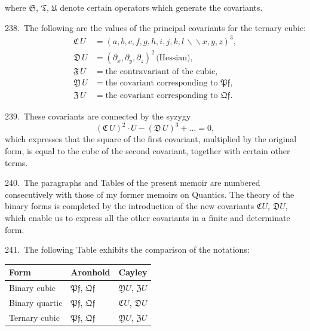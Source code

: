 \documentclass[11pt,a4paper]{article}
\theoremstyle{plain}
\theoremstyle{definition}
\theoremstyle{remark}
\begin{document}
where $\mathfrak{S}$, $\mathfrak{T}$, $\mathfrak{U}$ denote certain operators which generate the covariants.

\newpage
\setcounter{page}{334}

238.\ The following are the values of the principal covariants for the ternary cubic:
\begin{align*}
\mathfrak{C}\,U &= (a,b,c,f,g,h,i,j,k,l\,\backslash\!\!\backslash x,y,z)^3,\\
\mathfrak{D}\,U &= (\partial_x,\partial_y,\partial_z)^2\,\text{(Hessian)},\\
\mathfrak{F}\,U &= \text{the contravariant of the cubic},\\
\mathfrak{Y}\,U &= \text{the covariant corresponding to }\mathfrak{P}\mathfrak{f},\\
\mathfrak{Z}\,U &= \text{the covariant corresponding to }\mathfrak{Q}\mathfrak{f}.
\end{align*}

239.\ These covariants are connected by the syzygy
\[
(\mathfrak{C}\,U)^2\cdot U - (\mathfrak{D}\,U)^3 + \dots = 0,
\]
which expresses that the square of the first covariant, multiplied by the original form, is equal to the cube of the second covariant, together with certain other terms.

\newpage
\setcounter{page}{335}

240.\ The paragraphs and Tables of the present memoir are numbered consecutively with those of my former memoirs on Quantics. The theory of the binary forms is completed by the introduction of the new covariants $\mathfrak{C}U$, $\mathfrak{D}U$, which enable us to express all the other covariants in a finite and determinate form.

241.\ The following Table exhibits the comparison of the notations:

\begin{center}
\begin{tabular}{|l|l|l|}
\hline
\textbf{Form} & \textbf{Aronhold} & \textbf{Cayley} \\
\hline
Binary cubic & $\mathfrak{P}\mathfrak{f}$, $\mathfrak{Q}\mathfrak{f}$ & $\mathfrak{Y}U$, $\mathfrak{Z}U$ \\
Binary quartic & $\mathfrak{P}\mathfrak{f}$, $\mathfrak{Q}\mathfrak{f}$ & $\mathfrak{C}U$, $\mathfrak{D}U$ \\
Ternary cubic & $\mathfrak{P}\mathfrak{f}$, $\mathfrak{Q}\mathfrak{f}$ & $\mathfrak{Y}U$, $\mathfrak{Z}U$ \\
\hline
\end{tabular}
\end{center}
\end{document}
